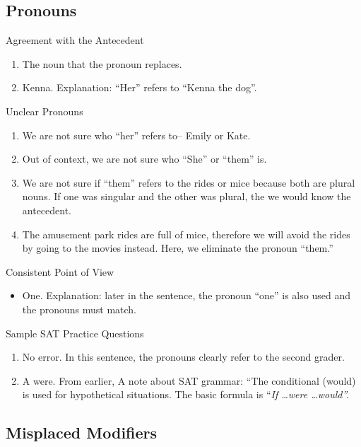 \subsection{Pronouns}

Agreement with the Antecedent

\begin{enumerate}
\item The noun that the pronoun replaces.
\item Kenna. Explanation: ``Her'' refers to ``Kenna the dog''.
\end{enumerate}

Unclear Pronouns

\begin{enumerate}
\item We are not sure who ``her'' refers to-- Emily or Kate.
\item Out of context, we are not sure who ``She'' or ``them'' is.
\item We are not sure if ``them'' refers to the rides or mice because both are plural nouns. If one was singular and the other was plural, the we would know the antecedent. 
\item The amusement park rides are full of mice, therefore we will avoid the rides by going to the movies instead. Here, we eliminate the pronoun ``them.''
\end{enumerate}

Consistent Point of View

\begin{itemize}
\item One. Explanation: later in the sentence, the pronoun ``one'' is also used and the pronouns must match. 
\end{itemize}

Sample SAT Practice Questions

\begin{enumerate}
\item No error. In this sentence, the pronouns clearly refer to the second grader. 

\item A were. From earlier, A note about SAT grammar: ``The conditional (would) is used for hypothetical situations. The basic formula is ``\textit{If \ldots were \ldots would''.}
\end{enumerate}

\subsection{Misplaced Modifiers}

